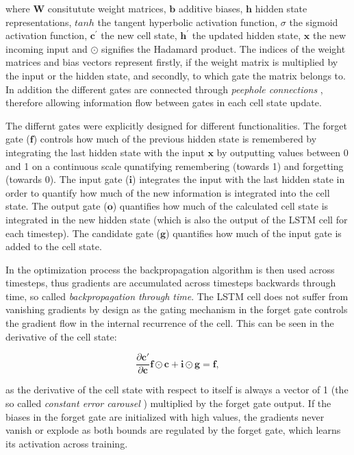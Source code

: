 \documentclass[12pt]{article}
\begin{document}
where $\mathbf{W}$ consitutute weight matrices, $\mathbf{b}$ additive biases, $\mathbf{h}$ hidden state representations, $tanh$ the tangent hyperbolic activation function, $\sigma$ the sigmoid activation function, $\mathbf{c^{\prime}}$ the new cell state, $\mathbf{h^{\prime}}$ the updated hidden state, $\mathbf{x}$ the new incoming input and $\odot$ signifies the Hadamard product. The indices of the weight matrices and bias vectors represent firstly, if the weight matrix is multiplied by the input or the hidden state, and secondly, to which gate the matrix belongs to. In addition the different gates are connected through \textit{peephole connections} \citep{gers2002learning}, therefore allowing information flow between gates in each cell state update. 

The differnt gates were explicitly designed for different functionalities.  The forget gate ($\mathbf{f}$) controls how much of the previous hidden state is remembered by integrating the last hidden state with the input $\mathbf{x}$ by outputting values between 0  and 1 on a continuous scale qunatifying remembering (towards 1) and forgetting (towards 0). The input gate ($\mathbf{i}$) integrates the input with the last hidden state in order to quantify how much of the new information is integrated into the cell state. The output gate ($\mathbf{o}$) quantifies how much of the calculated cell state is integrated in the new hidden state (which is also the output of the LSTM cell for each timestep). The candidate gate ($\mathbf{g}$) quantifies how much of the input gate is added to the cell state.

In the optimization process the backpropagation algorithm is then used across timesteps, thus gradients are accumulated across timesteps backwards through time, so called \textit{backpropagation through time}. The LSTM cell does not suffer from vanishing gradients by design as the gating mechanism in the forget gate controls the gradient flow in the internal recurrence of the cell. This can be seen in the derivative of the cell state: 

\begin{equation}
	\frac{\partial \mathbf{c'}}{\partial \mathbf{c}} \mathbf{f} \odot \mathbf{c} + \mathbf{i} \odot \mathbf{g} = \mathbf{f},
\end{equation}

as the derivative of the cell state with respect to itself is always a vector of 1 (the so called \textit{constant error carousel} \citep{hochreiter1997long}) multiplied by the forget gate output. If the biases in the forget gate are initialized with high values, the gradients never vanish or explode as both bounds are regulated by the forget gate, which learns its activation across training. 
\end{document}
